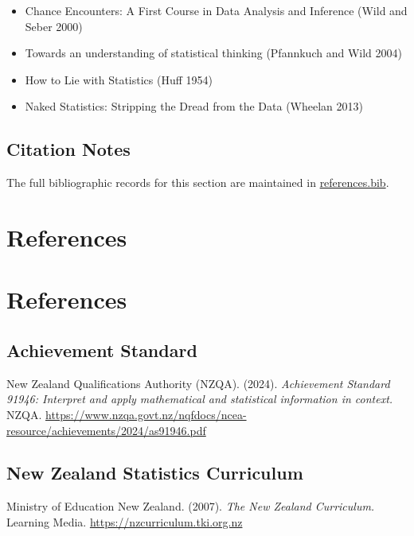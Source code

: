 \documentclass[
  11pt,
  a4paper,
  oneside,
  open=any]{scrbook}
\providecommand{\tightlist}{%
  \setlength{\itemsep}{0pt}\setlength{\parskip}{0pt}}
\begin{document}
\begin{itemize}
\tightlist
\item
  Chance Encounters: A First Course in Data Analysis and Inference (Wild
  and Seber 2000)
\item
  Towards an understanding of statistical thinking (Pfannkuch and Wild
  2004)
\item
  How to Lie with Statistics (Huff 1954)
\item
  Naked Statistics: Stripping the Dread from the Data (Wheelan 2013)
\end{itemize}

\section{Citation Notes}\label{citation-notes}

The full bibliographic records for this section are maintained in
\href{../references.bib}{references.bib}.


\chapter{References}\label{references}


\chapter*{References}\label{references-1}


\section{Achievement Standard}\label{achievement-standard}

New Zealand Qualifications Authority (NZQA). (2024). \emph{Achievement
Standard 91946: Interpret and apply mathematical and statistical
information in context.} NZQA.
\url{https://www.nzqa.govt.nz/nqfdocs/ncea-resource/achievements/2024/as91946.pdf}

\section{New Zealand Statistics
Curriculum}\label{new-zealand-statistics-curriculum}

Ministry of Education New Zealand. (2007). \emph{The New Zealand
Curriculum.} Learning Media. \url{https://nzcurriculum.tki.org.nz}
\end{document}
